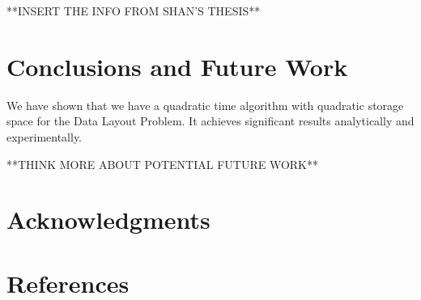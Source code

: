 \documentclass[11pt,psfig]{article}
\begin{document}
**INSERT THE INFO FROM SHAN'S THESIS**

\section*{Conclusions and Future Work}

We have shown that we have a quadratic time algorithm with quadratic storage space for the Data Layout Problem. It achieves significant results analytically and experimentally. 

**THINK MORE ABOUT POTENTIAL FUTURE WORK**

\section*{Acknowledgments}

\section*{References}    

\end{document}
